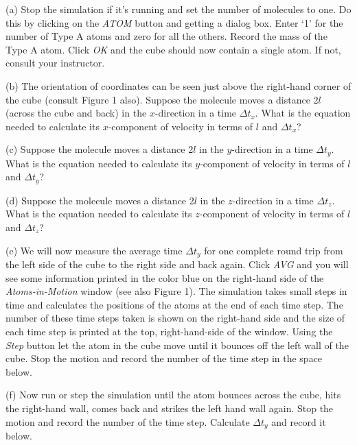 (a) Stop the simulation if it's running and set the number of molecules to 
one. Do this by clicking on the {\it ATOM} button and getting a dialog box.
Enter `1' for the
number of Type A atoms and zero for all the others. Record the mass of the
Type A atom. Click {\it OK} and
the cube should now contain a single atom. If not, consult your instructor.
\vspace{20mm}

(b) The orientation of coordinates can be seen just above the right-hand corner
of the cube (consult Figure 1 also).
Suppose the molecule moves a distance 2$l$ (across the cube and back) in the $x$-direction in
a time \( \Delta t_{x} \). What is the equation needed to calculate
its $x$-component of velocity in terms of $l$ and \( \Delta t_{x} \)?
\vspace{20mm}

(c) Suppose the molecule moves a distance 2$l$ in the $y$-direction in
a time \( \Delta t_{y} \). What is the equation needed to calculate
its $y$-component of velocity in terms of $l$ and \( \Delta t_{y} \)?
\vspace{20mm}

(d) Suppose the molecule moves a distance 2$l$ in the $z$-direction in
a time \( \Delta t_{z} \). What is the equation needed to calculate
its $z$-component of velocity in terms of $l$ and \( \Delta t_{z} \)?
\vspace{20mm}

(e) We will now measure the average time $\Delta t_y$ for one complete round trip
from the left side of the cube to the right side and back again.
Click {\it AVG} and you will see some information printed in the color blue
on the right-hand side of the {\it Atoms-in-Motion} window (see also Figure 1).
The simulation takes small steps in time and calculates the positions of the
atoms at the end of each time step.
The number of these time steps taken is shown on the right-hand side and the size 
of each time step is printed at the top, right-hand-side of the window.
Using the {\it Step} button let the atom in the cube move until it bounces off the left wall of the cube. Stop the motion and record the number of the time step in the space below.
\vspace{20mm}

(f) Now run or step the simulation until the atom bounces across the cube, hits the right-hand wall, comes back and strikes the left hand wall again. Stop the motion and record the number of the time step.
Calculate $\Delta t_y$ and record it below.
\vspace{20mm}

